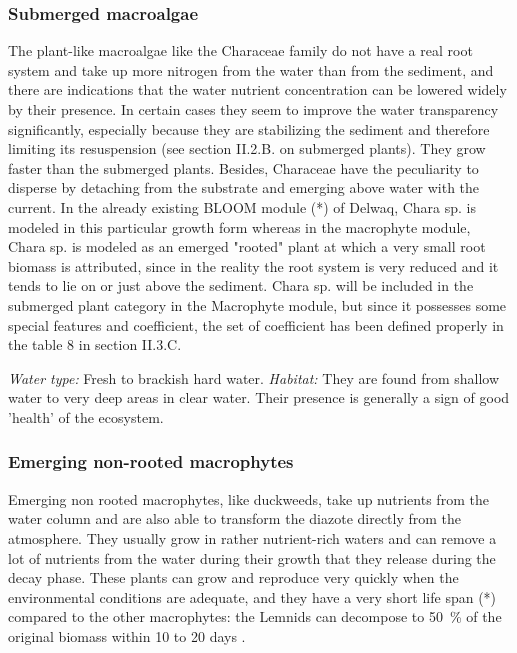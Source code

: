 \subsubsection*{Submerged macroalgae}
The plant-like macroalgae like the Characeae family do not have a real root system and  take up
more nitrogen from the water than from the sediment, \citep{VermeerEtAl} and there are indications
that the water nutrient concentration can be lowered widely by their presence. In certain cases they seem to
improve the water transparency significantly, especially because they are stabilizing the sediment
and therefore limiting its resuspension (see section II.2.B. on submerged plants). They grow faster
than the submerged plants. Besides, Characeae have the peculiarity to disperse by detaching from the
substrate and emerging above water with the current. In the already existing BLOOM module (*) of
Delwaq, Chara sp. is modeled in this particular growth form whereas in the macrophyte module,
Chara sp. is modeled as an emerged "rooted" plant at which a very small root biomass is attributed,
since in the reality the root system is very reduced and it tends to lie on or just above the sediment.
Chara sp. will be included in the submerged plant category in the Macrophyte module, but since it possesses some special features and coefficient, the set of coefficient has been defined properly in the table 8 in section II.3.C. %

\emph{Water type:} Fresh to brackish hard water.\newline
\emph{Habitat:} They are found from shallow water to very deep areas in clear water. Their presence is
generally a sign of good 'health' of the ecosystem.

\subsubsection*{Emerging non-rooted macrophytes}
Emerging non rooted macrophytes, like duckweeds, take up nutrients from the water column and are
also able to transform the diazote directly from the atmosphere. They usually grow in rather
nutrient-rich waters and can remove a lot of nutrients from the water during their growth that
they release during the decay phase. These plants can grow and reproduce very quickly when the
environmental conditions are adequate, and they have a very short life span (*) compared to the
other macrophytes: the Lemnids can decompose to 50\ \% of the original biomass within 10 to 20 days
\citep{StowaKrooslagen}.

